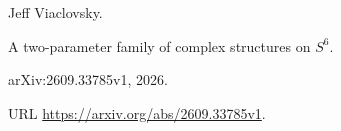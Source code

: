 Jeff Viaclovsky.

\newblock A two-parameter family of complex structures on {$S^6$}.

\newblock arXiv:2609.33785v1, 2026{}.

\newblock URL \url{https://arxiv.org/abs/2609.33785v1}.
